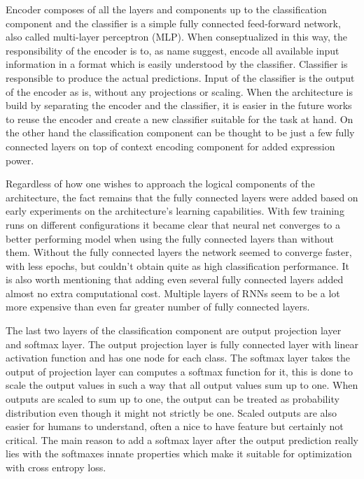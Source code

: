 \documentclass[12pt,a4paper,english
]{tutthesis}
\begin{document}
Encoder composes of all the layers and components up to the classification component and the classifier is a simple fully connected feed-forward network, also called multi-layer perceptron (MLP). When conseptualized in this way, the responsibility of the encoder is to, as name suggest, encode all available input information in a format which is easily understood by the classifier. Classifier is responsible to produce the actual predictions. Input of the classifier is the output of the encoder as is, without any projections or scaling. When the architecture is build by separating the encoder and the classifier, it is easier in the future works to reuse the encoder and create a new classifier suitable for the task at hand. On the other hand the classification component can be thought to be just a few fully connected layers on top of context encoding component for added expression power.

Regardless of how one wishes to approach the logical components of the architecture, the fact remains that the fully connected layers were added based on early experiments on the architecture's learning capabilities. With few training runs on different configurations it became clear that neural net converges to a better performing model when using the fully connected layers than without them. Without the fully connected layers the network seemed to converge faster, with less epochs, but couldn't obtain quite as high classification performance. It is also worth mentioning that adding even several fully connected layers added almost no extra computational cost. Multiple layers of RNNs seem to be a lot more expensive than even far greater number of fully connected layers.

The last two layers of the classification component are output projection layer and softmax layer. The output projection layer is fully connected layer with linear activation function and has one node for each class. The softmax layer takes the output of projection layer can computes a softmax function for it, this is done to scale the output values in such a way that all output values sum up to one. When outputs are scaled to sum up to one, the output can be treated as probability distribution even though it might not strictly be one. Scaled outputs are also easier for humans to understand, often a nice to have feature but certainly not critical. The main reason to add a softmax layer after the output prediction really lies with the softmaxes innate properties which make it suitable for optimization with cross entropy loss.
\end{document}
